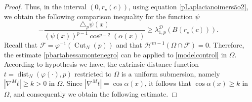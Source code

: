 \documentclass{article}
\begin{document}
\begin{proof}
Thus, in the interval $(0,r_\star(c))$, using equation \eqref{pLaplacianoimersão2}, we obtain the following comparison inequality for the function $\psi$
\begin{equation}\label{modelcontrol}
    -\frac{\triangle_p \psi(x)}{(\psi(x))^{p-1}\cos^{p-2}{\left(\alpha(x)\right)}} \geq \lambda_{1,p}^{\mathcal{D}}(B(r_\star(c))).
\end{equation}
Recall that $\mathcal{F}=\varphi^{-1}(\operatorname{Cut}_N(p))$ and that $\mathcal{H}^{m-1}(\Omega\cap\mathcal{F})=0$. Therefore, the estimate \eqref{pbartabessamontenegro} can be applied to \eqref{modelcontrol} in $\Omega$. According to hypothesis we have, the extrinsic distance function $t=\operatorname{dist}_N(\varphi(\cdot),p)$ restricted to $\Omega$ is a uniform submersion, namely $|\nabla^{M} t|\ge k>0$ in $\Omega$. Since $|\nabla^{M} t|=\cos\alpha(x)$, it follows that $\cos\alpha(x)\ge k$ in $\Omega$, and consequently we obtain the following estimate.


\end{proof}
\end{document}
